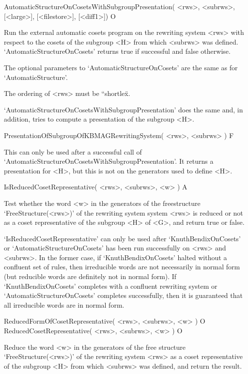 \>AutomaticStructureOnCosetsWithSubgroupPresentation(
                <rws>, <subrws>, [<large>], [<filestore>], [<diff1>]) O

Run  the  external automatic cosets  program  on  the rewriting system
<rws> with respect to the cosets of the subgroup <H> from which <subrws>
was defined.
`AutomaticStructureOnCosets' returns true if successful and false otherwise.

The optional parameters to `AutomaticStructureOnCosets' are the same as for
`AutomaticStructure'.

The ordering of <rws> must be {``shortlex\"}.

`AutomaticStructureOnCosetsWithSubgroupPresentation' does the same and, in
addition, tries to compute a presentation of the subgroup <H>.

\>PresentationOfSubgroupOfKBMAGRewritingSystem( <rws>, <subrws> ) F

This can only be used after a successful call of
`AutomaticStructureOnCosetsWithSubgroupPresentation'.
It returns a presentation for <H>, but this is not on the generators
used to define <H>.


\>IsReducedCosetRepresentative( <rws>, <subrws>, <w> ) A

Test  whether the word <w> in  the generators of  the freestructure
`FreeStructure(<rws>)' of the rewriting system system
<rws> is reduced or not as a coset representative of the subgroup <H>
of <G>, and return true or false.

`IsReducedCosetRepresentative' can only be used after
`KnuthBendixOnCosets' or `AutomaticStructureOnCosets' has been run
successfully on <rws> and <subrws>. In the former case, if
`KnuthBendixOnCosets' halted without a  confluent set of rules, then 
irreducible words are not necessarily in  normal form (but  reducible  words
are  definitely  not in  normal form).  If  `KnuthBendixOnCosets' completes
with    a  confluent rewriting system  or `AutomaticStructureOnCosets'
completes  successfully, then  it is guaranteed that  all irreducible words
are in normal form.

\medskip
\>ReducedFormOfCosetRepresentative( <rws>, <subrws>, <w> ) O
\>ReducedCosetRepresentative( <rws>, <subrws>, <w> ) O

Reduce the word  <w> in the generators of the free structure
`FreeStructure(<rws>)' of the rewriting system  <rws>
as a coset representative of the subgroup <H> from which <subrws>
was defined, and return the result.


